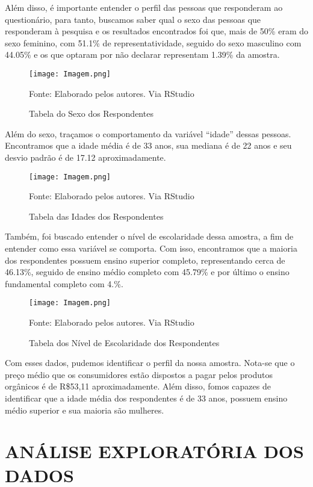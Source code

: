 \documentclass[a4paper,12pt]{article}[abntex2]
\begin{document}
Além disso, é importante entender o perfil das pessoas que responderam ao questionário, para tanto, buscamos saber qual o sexo das pessoas que responderam à pesquisa e os resultados encontrados foi que, mais de 50\% eram do sexo feminino, com 51.1\% de representatividade, seguido do sexo masculino com 44.05\% e os que optaram por não declarar representam 1.39\% da amostra.  

\begin{figure}[H]
\centering
\caption{Tabela do Sexo dos Respondentes}
\texttt{[image: Imagem.png]}
\label{fig:my_label}

\footnotesize{Fonte: Elaborado pelos autores. Via RStudio}
\end{figure}

Além do sexo, traçamos o comportamento da variável “idade” dessas pessoas. Encontramos que a idade média é de 33 anos, sua mediana é de 22 anos e seu desvio padrão é de 17.12 aproximadamente.  

\begin{figure}[H]
\centering
\caption{Tabela das Idades dos Respondentes}
\texttt{[image: Imagem.png]}
\label{fig:my_label}

\footnotesize{Fonte: Elaborado pelos autores. Via RStudio}
\end{figure}

Também, foi buscado entender o nível de escolaridade dessa amostra, a fim de entender como essa variável se comporta. Com isso, encontramos que a maioria dos respondentes possuem ensino superior completo, representando cerca de 46.13\%, seguido de ensino médio completo com 45.79\% e por último o ensino fundamental completo com 4.\%.

\begin{figure}[H]
\centering
\caption{Tabela dos Nível de Escolaridade dos Respondentes}
\texttt{[image: Imagem.png]}
\label{fig:my_label}

\footnotesize{Fonte: Elaborado pelos autores. Via RStudio}
\end{figure}

Com esses dados, pudemos identificar o perfil da nossa amostra. Nota-se que o preço médio que os consumidores estão dispostos a pagar pelos produtos orgânicos é de R\$53,11 aproximadamente. Além disso, fomos capazes de identificar que a idade média dos respondentes é de 33 anos, possuem ensino médio superior e sua maioria são mulheres. 

\section{\textbf{ANÁLISE EXPLORATÓRIA DOS DADOS}}
\end{document}
